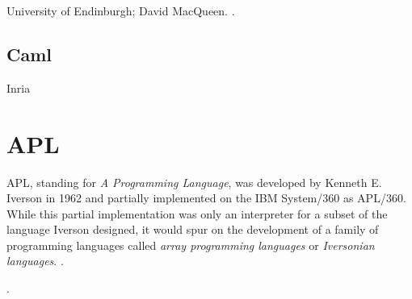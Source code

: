University of Endinburgh; David MacQueen.
.

\subsection{Caml}

Inria

\section{APL}

APL, standing for \textit{A Programming Language}, was developed by Kenneth E. Iverson in 1962
and partially implemented on the IBM System/360 as APL/360.
While this partial implementation was only an interpreter for a subset of the language Iverson
designed, it would spur on the development of a family of programming languages
called \textit{array programming languages} or \textit{Iversonian languages}.
.

.
